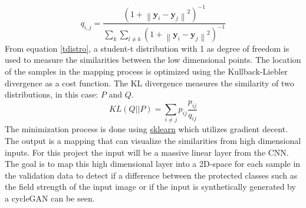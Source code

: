 \documentclass[12pt, fleqn, titlepage]{article}
\newcommand{\norm}[1]{\left\lVert#1\right\rVert}
\newcommand{\1}[1]{\mathds{1}\left[#1\right]}
\begin{document}
\begin{equation}\label{tdistro}
	q_{i,j} = \frac{(1 + \norm{\mathbf y_i - \mathbf y_j}^2)^{-1}}{\sum_k \sum_{l \neq k}(1 + \norm{\mathbf y_i - \mathbf y_j}^2)^{-1}}
\end{equation}
From equation \eqref{tdistro}, a student-t distribution with 1 as degree of freedom is used to measure the similarities between the low dimensional points. 
The location of the samples in the mapping process is optimized using the Kullback-Liebler divergence as a cost function. The KL divergence measures the similarity of two distributions, in this case: $ P $ and $ Q $. 
\begin{equation*}\label{key}
	KL(Q \vert \vert P) = \sum_{i \neq j} p_{ij} \frac{p_{ij}}{q_{ij}}
\end{equation*} 
The minimization process is done using \href{https://scikit-learn.org/stable/modules/generated/sklearn.manifold.TSNE.html}{sklearn} which utilizes gradient decent. The output is a mapping that can visualize the similarities from high dimensional inputs. For this project the input will be a massive linear layer from the CNN. The goal is to map this high dimensional layer into a 2D-space for each sample in the validation data to detect if a difference between the protected classes such as the field strength of the input image or if the input is synthetically generated by a cycleGAN can be seen.
\end{document}
